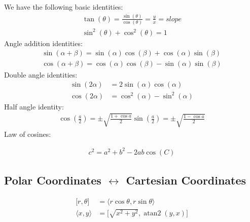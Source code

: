 \documentclass[12pt]{report}
\DeclareMathOperator{\atan}{atan2}
\begin{document}
We have the following basic identities:
\begin{align*}
	\tan(\theta) = \frac{\sin(\theta)}{\cos(\theta)} = \frac{y}{x} = slope \\
	\sin^2(\theta) + \cos^2(\theta) = 1                                    
\end{align*}
Angle addition identities:
\begin{align*}
	\sin(\alpha + \beta) = \sin(\alpha)\cos (\beta) + \cos(\alpha)\sin(\beta) \\
	\cos(\alpha + \beta) = \cos(\alpha)\cos (\beta) - \sin(\alpha)\sin(\beta) 
\end{align*}
Double angle identities:
\begin{align*}
	\sin(2\alpha) & = 2\sin(\alpha)\cos (\alpha)     \\
	\cos(2\alpha) & = \cos^2(\alpha)- \sin^2(\alpha) 
\end{align*}
Half angle identity:
\begin{align*}
	\cos\left(\frac{a}{2}\right) = \pm \sqrt{\frac{1 + \cos{a}}{2}} 
	\sin\left(\frac{a}{2}\right) = \pm \sqrt{\frac{1 - \cos{a}}{2}} 
\end{align*}
Law of cosines:
	
\begin{align*}
	c^2 = a^2 + b^2 -2ab\cos(C) 
\end{align*}
\subsection{Polar Coordinates $\leftrightarrow$ Cartesian Coordinates}
\begin{align*}
	\lbrack r, \theta \rbrack & = \langle r\cos\theta, r\sin\theta \rangle      \\
	\langle x, y \rangle      & = \lbrack \sqrt{x^2 + y^2}, \atan(y, x) \rbrack 
\end{align*}
	
\end{document}
